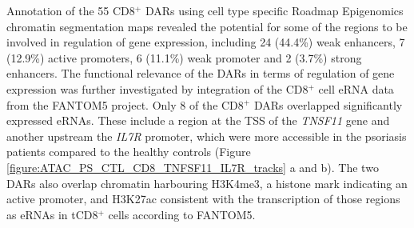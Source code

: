 Annotation of the 55 CD8$^+$ DARs using cell type specific Roadmap Epigenomics chromatin segmentation maps revealed the potential for some of the regions to be involved in regulation of gene expression, including 24 (44.4\%) weak enhancers, 7 (12.9\%) active promoters, 6 (11.1\%) weak promoter and 2 (3.7\%) strong enhancers. The functional relevance of the DARs in terms of regulation of gene expression was further investigated by integration of the CD8$^+$ cell eRNA data from the FANTOM5 project. Only 8 of the CD8$^+$ DARs overlapped significantly expressed eRNAs. These include a region at the TSS of the \textit{TNSF11} gene and another upstream the \textit{IL7R} promoter, which were more accessible in the psoriasis patients compared to the healthy controls (Figure \ref{figure:ATAC_PS_CTL_CD8_TNFSF11_IL7R_tracks} a and b). The two DARs also overlap chromatin harbouring H3K4me3, a histone mark indicating an active promoter, and H3K27ac consistent with the transcription of those regions as eRNAs in tCD8$^+$ cells according to FANTOM5.

